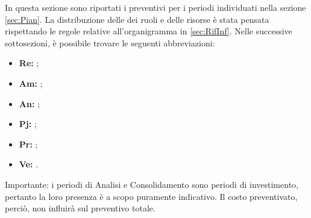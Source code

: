 In questa sezione sono riportati i preventivi per i periodi individuati nella sezione \cref{sec:Pian}. \newline
La distribuzione delle dei ruoli e delle risorse è stata pensata rispettando le regole relative all'organigramma in \cref{sec:RifInf}.\newline
Nelle successive sottosezioni, è possibile trovare le seguenti abbreviazioni:
\begin{itemize}
	\item \textbf{Re: }\Res{};
	\item \textbf{Am: }\adm{};
	\item \textbf{An: }\ana{};
	\item \textbf{Pj: }\prog{};
	\item \textbf{Pr: }\progr{};
	\item \textbf{Ve: }\ver{}.
\end{itemize}

\bigskip
\bigskip
Importante: i periodi di Analisi e Consolidamento sono {periodi di investimento}, pertanto la loro presenza è a scopo puramente indicativo. Il costo preventivato, perciò, non influirà sul preventivo totale.\newline